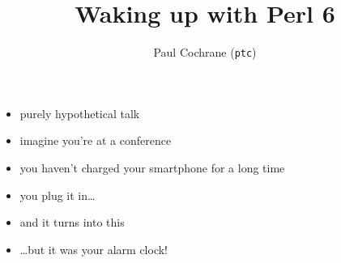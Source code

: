\documentclass[c]{beamer}
\title{Waking up with Perl 6}
\author{Paul Cochrane (\texttt{ptc})}
\begin{document}
\begin{frame}
    \titlepage{}
\end{frame}

\begin{frame}
    \begin{itemize}
        \item purely hypothetical talk
            \pause{}
        \item imagine you're at a conference
            \pause{}
        \item you haven't charged your smartphone for a long time
    \end{itemize}
\end{frame}

\begin{frame}
    \begin{itemize}
        \item you plug it in\ldots
            \pause{}
        \item and it turns into this
    \end{itemize}
\end{frame}

\begin{frame}
    \begin{itemize}
        \item \ldots but it was your alarm clock!
    \end{itemize}
\end{frame}
\end{document}
